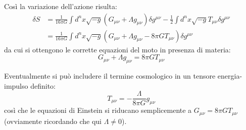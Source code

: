 Così la variazione dell'azione risulta:
\begin{align*}
    \delta S &= \frac{1}{16\pi G} \int d^nx \sqrt{-g}(G_{\mu\nu}+ \Lambda g_{\mu\nu})\delta g^{\mu\nu} - \frac{1}{2}\int d^n x\sqrt{-g}T_{\mu\nu} \delta g^{\mu\nu} \\
    &= \frac{1}{16\pi G} \int d^nx \sqrt{-g}(G_{\mu\nu}+ \Lambda g_{\mu\nu} - 8\pi G T_{\mu\nu} )\delta g^{\mu\nu}
\end{align*}
da cui si ottengono le corrette equazioni del moto in presenza di materia:
\begin{equation*}
    G_{\mu\nu} + \Lambda g_{\mu\nu} = 8\pi G T_{\mu\nu}
\end{equation*}

Eventualmente si può includere il termine cosmologico in un tensore energia-impulso definito:
\begin{equation}
    T_{\mu\nu} = - \frac{\Lambda}{8\pi G}g_{\mu\nu}
    \label{eq.tensore_enimpulso_cosmologica}
\end{equation}
così che le equazioni di Einstein si riducano semplicemente a $G_{\mu\nu} = 8\pi GT_{\mu\nu}$ (ovviamente ricordando che qui $\Lambda \neq 0$).


